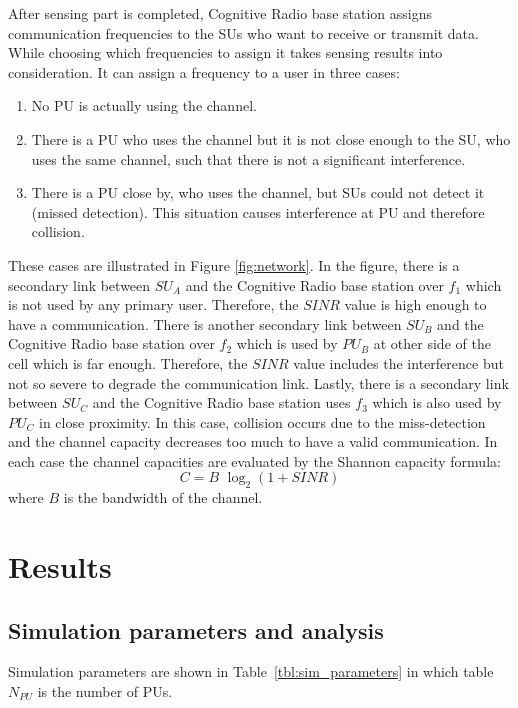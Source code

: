 \documentclass[conference,compsoc]{IEEEtran}
\newcommand{\CR}{Cognitive Radio }
\begin{document}
After sensing part is completed, \CR base station assigns communication frequencies to the SUs who want to receive or transmit data. While choosing which frequencies to assign it takes sensing results into consideration. It can assign a frequency to a user in three cases:
\begin{enumerate}
\item No PU is actually using the channel.
\item There is a PU who uses the channel but it is not close enough to the SU, who uses the same channel,
      such that there is not a significant interference.
\item There is a PU close by, who uses the channel, but SUs could not detect it (missed detection). This
      situation causes interference at PU and therefore collision.
\end{enumerate}

These cases are illustrated in Figure \ref{fig:network}. In the figure, there is a secondary link between $SU_A$ and the \CR base station over $f_1$ which is not used by any primary user. Therefore, the $SINR$ value is high enough to have a communication. There is another secondary link between $SU_B$ and the \CR base station over $f_2$ which is used by $PU_B$ at other side of the cell which is far enough. Therefore, the $SINR$ value includes the interference but not so severe to degrade the communication link. Lastly, there is a secondary link between $SU_C$ and the \CR base station uses $f_3$ which is also used by $PU_C$ in close proximity. In this case, collision occurs due to the miss-detection and the channel capacity decreases too much to have a valid communication. In each case the channel capacities are evaluated by the Shannon capacity formula:
\begin{equation}
    C = B\,\, \log_2(1+SINR)
\end{equation}
where $B$ is the bandwidth of the channel.

\section{\label{sec:results}Results}
\subsection{Simulation parameters and analysis}
Simulation parameters are shown in Table~\ref{tbl:sim_parameters} in which table $N_{PU}$ is the number of PUs.
\end{document}
